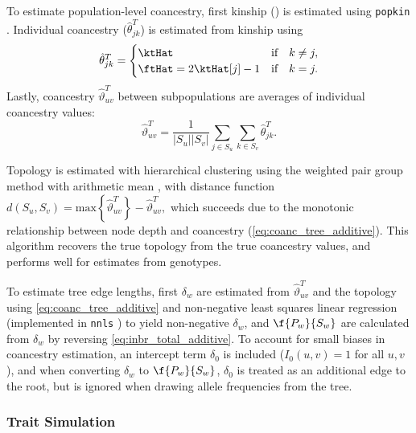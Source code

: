\documentclass[11pt]{article}
\begin{document}
To estimate population-level coancestry, first kinship (\ktHat) is estimated using \texttt{popkin} \citep{ochoa_estimating_2021}.
Individual coancestry ($\hat{\theta}_{jk}^T$) is estimated from kinship using
\begin{equation}
  \label{eq:kinship_to_coanc}
  \hat{\theta}_{jk}^T
  =
  \begin{cases}
    \ktHat & \text{if} \quad k \ne j, \\
    \ftHat = 2 \ktHat[j] - 1 & \text{if} \quad k = j.
  \end{cases}
\end{equation}
Lastly, coancestry $\hat{\vartheta}_{uv}^T$ between subpopulations are averages of individual coancestry values:
$$
\hat{\vartheta}_{uv}^T
=
\frac{1}{|S_u||S_v|} \sum_{j \in S_u} \sum_{k \in S_v} \hat{\theta}_{jk}^T
.
$$

Topology is estimated with hierarchical clustering using the weighted pair group method with arithmetic mean \citep{sokal_statistical_1958}, with distance function
$
d( S_u, S_v ) = \text{max} \left\{ \hat{\vartheta}_{uv}^T \right\} - \hat{\vartheta}_{uv}^T,
$
which succeeds due to the monotonic relationship between node depth and coancestry (\cref{eq:coanc_tree_additive}).
This algorithm recovers the true topology from the true coancestry values, and performs well for estimates from genotypes.

To estimate tree edge lengths, first $\delta_w$ are estimated from $\hat{\vartheta}_{uv}^T$ and the topology using \cref{eq:coanc_tree_additive} and non-negative least squares linear regression \citep{lawson_solving_1974} (implemented in \texttt{nnls} \cite{mullen_nnls_2012}) to yield non-negative $\delta_w$, and $\f{P_w}{S_w}$ are calculated from $\delta_w$ by reversing \cref{eq:inbr_total_additive}.
To account for small biases in coancestry estimation, an intercept term $\delta_0$ is included ($I_0(u,v) = 1$ for all $u,v$), and when converting $\delta_w$ to $\f{P_w}{S_w}$, $\delta_0$ is treated as an additional edge to the root, but is ignored when drawing allele frequencies from the tree.

\subsubsection{Trait Simulation}
\end{document}
